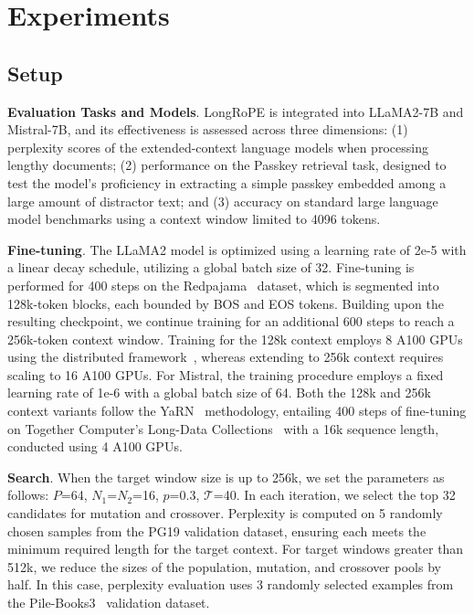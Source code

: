  \section{Experiments}

\label{sec:exp}
\subsection{Setup}
\textbf{Evaluation Tasks and Models}. LongRoPE is integrated into LLaMA2-7B and Mistral-7B, and its effectiveness is assessed across three dimensions: (1) perplexity scores of the extended-context language models when processing lengthy documents; (2) performance on the Passkey retrieval task, designed to test the model’s proficiency in extracting a simple passkey embedded among a large amount of distractor text; and (3) accuracy on standard large language model benchmarks using a context window limited to 4096 tokens.

\textbf{Fine-tuning}. The LLaMA2 model is optimized using a learning rate of 2e-5 with a linear decay schedule, utilizing a global batch size of 32. Fine-tuning is performed for 400 steps on the Redpajama~\cite{redpajama} dataset, which is segmented into 128k-token blocks, each bounded by BOS and EOS tokens. Building upon the resulting checkpoint, we continue training for an additional 600 steps to reach a 256k-token context window. Training for the 128k context employs 8 A100 GPUs using the distributed framework~\cite{cube}, whereas extending to 256k context requires scaling to 16 A100 GPUs. For Mistral, the training procedure employs a fixed learning rate of 1e-6 with a global batch size of 64. Both the 128k and 256k context variants follow the YaRN~\cite{yarn} methodology, entailing 400 steps of fine-tuning on Together Computer’s Long-Data Collections~\cite{mistraldata} with a 16k sequence length, conducted using 4 A100 GPUs.

\textbf{Search}. When the target window size is up to 256k, we set the parameters as follows: $P$=64, $N_1$=$N_2$=16, $p$=0.3, $\mathcal{T}$=40. In each iteration, we select the top 32 candidates for mutation and crossover. Perplexity is computed on 5 randomly chosen samples from the PG19 validation dataset, ensuring each meets the minimum required length for the target context. For target windows greater than 512k, we reduce the sizes of the population, mutation, and crossover pools by half. In this case, perplexity evaluation uses 3 randomly selected examples from the Pile-Books3~\cite{pile} validation dataset.

